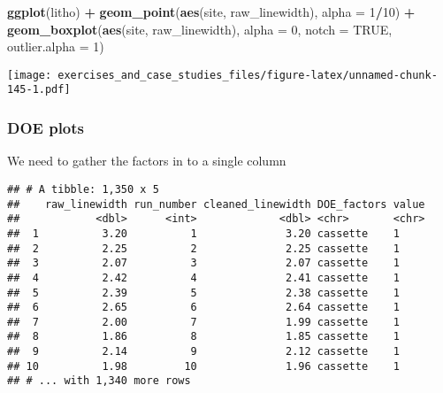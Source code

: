 \documentclass[]{book}
\newenvironment{Shaded}{\begin{snugshade}}{\end{snugshade}}
\newcommand{\DataTypeTok}[1]{\textcolor[rgb]{0.13,0.29,0.53}{#1}}
\newcommand{\DecValTok}[1]{\textcolor[rgb]{0.00,0.00,0.81}{#1}}
\newcommand{\KeywordTok}[1]{\textcolor[rgb]{0.13,0.29,0.53}{\textbf{#1}}}
\newcommand{\NormalTok}[1]{#1}
\newcommand{\OperatorTok}[1]{\textcolor[rgb]{0.81,0.36,0.00}{\textbf{#1}}}
\newcommand{\OtherTok}[1]{\textcolor[rgb]{0.56,0.35,0.01}{#1}}
\newcommand{\StringTok}[1]{\textcolor[rgb]{0.31,0.60,0.02}{#1}}
\theoremstyle{definition}
\theoremstyle{definition}
\theoremstyle{definition}
\theoremstyle{remark}
\begin{document}
\begin{Shaded}
\begin{Highlighting}[]
\KeywordTok{ggplot}\NormalTok{(litho) }\OperatorTok{+}
\StringTok{  }\KeywordTok{geom_point}\NormalTok{(}\KeywordTok{aes}\NormalTok{(site, raw_linewidth), }\DataTypeTok{alpha =} \DecValTok{1}\OperatorTok{/}\DecValTok{10}\NormalTok{) }\OperatorTok{+}
\StringTok{  }\KeywordTok{geom_boxplot}\NormalTok{(}\KeywordTok{aes}\NormalTok{(site, raw_linewidth), }\DataTypeTok{alpha =} \DecValTok{0}\NormalTok{, }\DataTypeTok{notch =} \OtherTok{TRUE}\NormalTok{, }\DataTypeTok{outlier.alpha =} \DecValTok{1}\NormalTok{)}
\end{Highlighting}
\end{Shaded}

\texttt{[image: exercises\_and\_case\_studies\_files/figure-latex/unnamed-chunk-145-1.pdf]}

\hypertarget{doe-plots}{%
\subsubsection{DOE plots}\label{doe-plots}}

We need to gather the factors in to a single column

\begin{Shaded}
\end{Shaded}

\begin{verbatim}
## # A tibble: 1,350 x 5
##    raw_linewidth run_number cleaned_linewidth DOE_factors value
##            <dbl>      <int>             <dbl> <chr>       <chr>
##  1          3.20          1              3.20 cassette    1    
##  2          2.25          2              2.25 cassette    1    
##  3          2.07          3              2.07 cassette    1    
##  4          2.42          4              2.41 cassette    1    
##  5          2.39          5              2.38 cassette    1    
##  6          2.65          6              2.64 cassette    1    
##  7          2.00          7              1.99 cassette    1    
##  8          1.86          8              1.85 cassette    1    
##  9          2.14          9              2.12 cassette    1    
## 10          1.98         10              1.96 cassette    1    
## # ... with 1,340 more rows
\end{verbatim}
\end{document}
